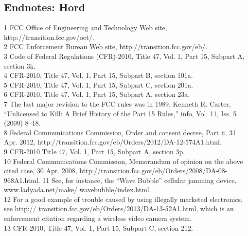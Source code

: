 \begin{itemize}
\section{Endnotes: Hord}
1 FCC Office of Engineering and Technology Web site, http://transition.fcc.gov/oet/.\\
2 FCC Enforcement Bureau Web site, http://transition.fcc.gov/eb/.\\
3 Code of Federal Regulations (CFR)-2010, Title 47, Vol. 1, Part 15, Subpart A, section 3k.\\
4 CFR-2010, Title 47, Vol. 1, Part 15, Subpart B, section 101a.\\
5 CFR-2010, Title 47, Vol. 1, Part 15, Subpart C, section 201a.\\
6 CFR-2010, Title 47, Vol. 1, Part 15, Subpart A, section 23a.\\
7 The last major revision to the FCC rules was in 1989. Kenneth R. Carter, ``Unlicensed to Kill: A
Brief History of the Part 15 Rules,'' info, Vol. 11, Iss. 5 (2009) 8–18.\\
8 Federal Communications Commission, Order and consent decree, Part ii, 31 Apr. 2012,
http://transition.fcc.gov/eb/Orders/2012/DA-12-574A1.html.\\
9 CFR-2010 Title 47, Vol. 1, Part 15, Subpart A, section 3p.\\
10 Federal Communications Commission, Memorandum of opinion on the above cited case, 30 Apr. 2008, http://transition.fcc.gov/eb/Orders/2008/DA-08-968A1.html.
11 See, for instance, the ``Wave Bubble'' cellular jamming device, www.ladyada.net/make/
wavebubble/index.html.\\
12 For a good example of trouble caused by using illegally marketed electronics, see http://
transition.fcc.gov/eb/Orders/2013/DA-13-52A1.html, which is an enforcement citation
regarding a wireless video camera system.\\
13 CFR-2010, Title 47, Vol. 1, Part 15, Subpart C, section 212.\\


\end{itemize}
